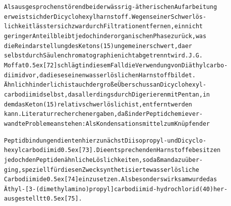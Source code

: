 \documentclass[a4paper,11pt]{article}
\begin{document}
\begin{alltt}
Als ausgesprochen störend bei der wässrig-ätherischen Aufarbeitung
erweist sich der Dicyclohexylharnstoff. Wegen seiner Schwerlös-
lichkeit lässt er sich zwar durch Filtration entfernen, ein nicht
geringer Anteil bleibt jedoch in der organischen Phase zurück, was
die Reindarstellung des Ketons (15) ungemein erschwert, da er
selbst durch Säulenchromatographie nicht abgetrennt wird. J. G.
Moffat \raise0.5ex\hbox{[72]} schlägt in diesem Fall die Verwendung von Diäthylcarbo-
diimid vor, da dieses einen wasserlöslichen Harnstoff bildet.
Ähnlich hinderlich ist auch der große Überschuss an Dicyclohexyl-
carbodiimid selbst, das allerdings durch Digerieren mit Pentan, in
dem das Keton (15) relativ schwer löslich ist, entfernt werden
kann. Literaturrecherchen ergaben, daß in der Peptidchemie ver-
wandte Probleme anstehen: Als Kondensationsmittel zum Knüpfen der
\newpage
{}


Peptidbindungen dienten hier zunächst Diisopropyl- und Dicyclo-
hexylcarbodiimid \raise0.5ex\hbox{[73]}. Die entsprechenden Harnstoffe besitzen
jedoch den Peptiden ähnliche Löslichkeiten, so daß man dazu über-
ging, speziell für diesen Zweck synthetisierte wasserlösliche
Carbodiimide \raise0.5ex\hbox{[74]} einzusetzen. Als besonders wirksam wurde das
Äthyl-[3-(dimethylamino)propyl]carbodiimid-hydrochlorid (40) her-
ausgestelltt \raise0.5ex\hbox{[75]}.

\end{alltt}
\hspace{3cm}
\end{document}
